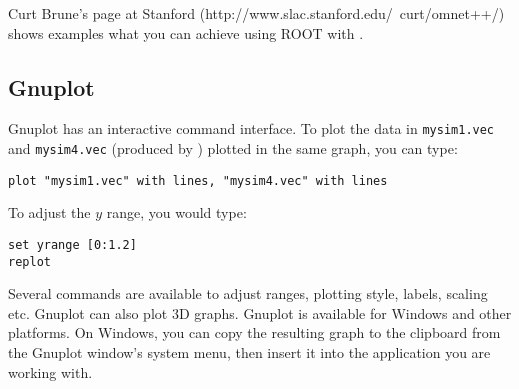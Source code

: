 Curt Brune's page at Stanford (http://www.slac.stanford.edu/~curt/omnet++/)
shows examples what you can achieve using ROOT with {\opp}.


\subsection{Gnuplot}

Gnuplot has an interactive command interface. To plot the data in
\texttt{mysim1.vec} and \texttt{mysim4.vec} (produced by )
plotted in the same graph, you can type:

\begin{verbatim}
plot "mysim1.vec" with lines, "mysim4.vec" with lines
\end{verbatim}

To adjust the $y$ range, you would type:

\begin{verbatim}
set yrange [0:1.2]
replot
\end{verbatim}

Several commands are available to adjust ranges, plotting style, labels,
scaling etc. Gnuplot can also plot 3D graphs. Gnuplot
is available for Windows and other platforms.
On Windows, you can copy the resulting graph to the clipboard from
the Gnuplot window's system menu, then insert it into the application you
are working with.



